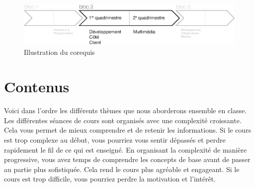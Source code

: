 \begin{figure}[H]
    \begin{center}
        \includegraphics[width=\textwidth]{figures/corequis.eps}
        \caption{Illustration du corequis}
        \label{Fig:GQM}
    \end{center}
\end{figure}
\clearpage

\section{Contenus}
Voici dans l'ordre les différents thèmes que nous aborderons ensemble en classe. Les différentes séances de cours sont organisés avec une complexité croissante. Cela vous permet de mieux comprendre et de retenir les informations. Si le cours est trop complexe au début, vous pourriez vous sentir dépassés et perdre rapidement le fil de ce qui est enseigné. En organisant la complexité de manière progressive, vous avez temps de comprendre les concepts de base avant de passer au partie plus sofistiquée. Cela rend le cours plus agréable et engageant. Si le cours est trop difficile, vous pourriez perdre la motivation et l'intérêt.


